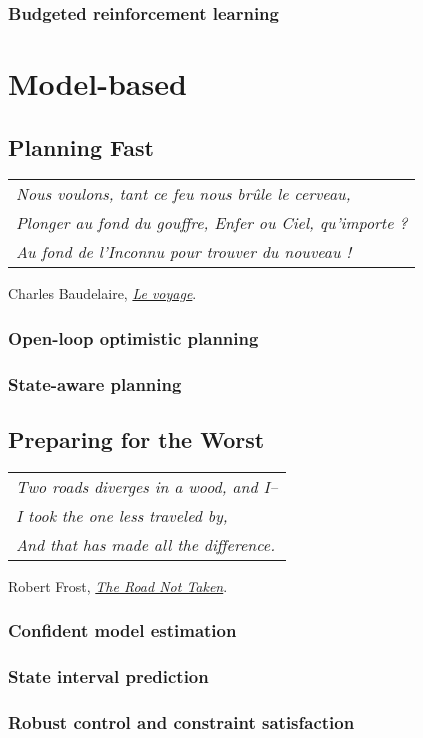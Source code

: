 \section{Budgeted reinforcement learning}
\part{Model-based}
\chapter{Planning Fast}
\begin{flushright}
	\begin{tabular}{@{}l@{}}
		\emph{Nous voulons, tant ce feu nous brûle le cerveau,}\\
		\emph{Plonger au fond du gouffre, Enfer ou Ciel, qu’importe ?}\\
		\emph{Au fond de l’Inconnu pour trouver du nouveau !}\\
	\end{tabular}

	Charles Baudelaire, \href{https://eleurent.github.io/sisyphe/texts/le-voyage.html}{\emph{Le voyage}}.
\end{flushright}

\section{Open-loop optimistic planning}
\section{State-aware planning}
\chapter{Preparing for the Worst}

\begin{flushright}
	\begin{tabular}{@{}l@{}}
		\emph{Two roads diverges in a wood, and I--}\\
		\emph{I took the one less traveled by,}\\
		\emph{And that has made all the difference.}\\
	\end{tabular}

	Robert Frost, \href{https://eleurent.github.io/sisyphe/texts/the-road-not-taken.html}{\emph{The Road Not Taken}}.
\end{flushright}


\section{Confident model estimation}
\section{State interval prediction}
\section{Robust control and constraint satisfaction}

